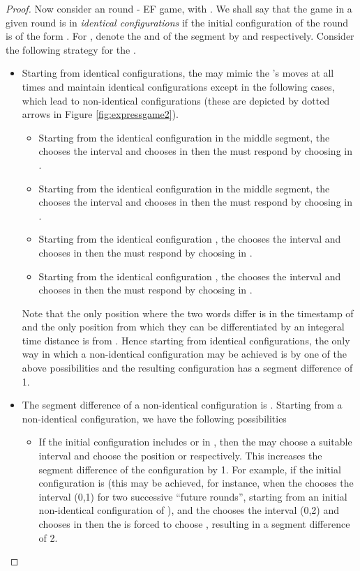 \documentclass{llncs}
\newcommand{\ssp}{\mbox{}}
\newcommand{\ddp}{\mbox{}}
\newcommand{\mitlfpzinf}{\mbox{}}
\begin{document}
\begin{proof}
Now consider an  round \mitlfpzinf- EF game, with . We shall say that the game in a given round is in \emph{identical configurations} if the initial configuration of the round is of the form . For , denote the  and  of the  segment by  and  respectively. Consider the following strategy for the \ddp.
\begin{itemize}
\item Starting from identical configurations, the \ddp\/ may mimic the \ssp's moves at all times and maintain identical configurations except in the following cases, which lead to non-identical configurations (these are depicted by dotted arrows in Figure \ref{fig:expressgame2}).
\begin{itemize}
\item Starting from the identical configuration  in the middle segment, the \ssp\/ chooses the interval  and chooses  in  then the \ddp\/ must respond by choosing  in . 
\item Starting from the identical configuration  in the middle segment, the \ssp\/ chooses the interval  and chooses  in  then the \ddp\/ must respond by choosing  in .
\item Starting from the identical configuration , the \ssp\/ chooses the interval  and chooses  in  then the \ddp\/ must respond by choosing  in .
\item Starting from the identical configuration , the \ssp\/ chooses the interval  and chooses  in  then the \ddp\/ must respond by choosing  in .
\end{itemize}
Note that the only position where the two words differ is in the timestamp of  and the only position from which they can be differentiated by an integeral time distance is from . Hence starting from identical configurations, the only way in which a non-identical configuration may be achieved is by one of the above possibilities and the resulting configuration has a segment difference of 1.
\item The segment difference of a non-identical configuration is . Starting from a non-identical configuration, we have the following possibilities
\begin{itemize}
\item If the initial configuration includes  or  in , then the \ssp\/ may choose a suitable interval and choose the position  or  respectively. This increases the segment difference of the configuration by 1. For example, if the initial configuration is  (this may be achieved, for instance, when the \ssp\/ chooses the interval (0,1) for two successive ``future rounds'', starting from an initial non-identical configuration of ), and the \ssp\/ chooses the interval (0,2) and chooses  in  then the \ddp\/ is forced to choose , resulting in a segment difference of 2.

\end{itemize}
\end{itemize}
\end{proof}
\end{document}
